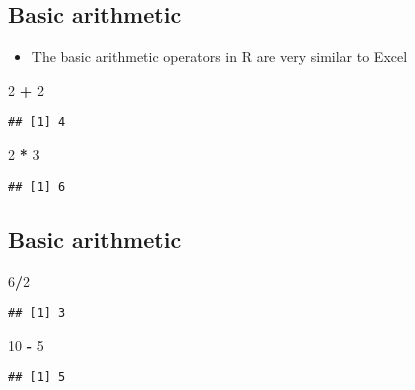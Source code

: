 \documentclass[]{article}
\newenvironment{Shaded}{\begin{snugshade}}{\end{snugshade}}
\newcommand{\DecValTok}[1]{\textcolor[rgb]{0.00,0.00,0.81}{#1}}
\newcommand{\StringTok}[1]{\textcolor[rgb]{0.31,0.60,0.02}{#1}}
\newcommand{\OperatorTok}[1]{\textcolor[rgb]{0.81,0.36,0.00}{\textbf{#1}}}
\providecommand{\tightlist}{%
  \setlength{\itemsep}{0pt}\setlength{\parskip}{0pt}}
\begin{document}
\subsection{Basic arithmetic}\label{basic-arithmetic}

\begin{itemize}
\tightlist
\item
  The basic arithmetic operators in R are very similar to Excel
\end{itemize}

\begin{Shaded}
\begin{Highlighting}[]
\DecValTok{2} \OperatorTok{+}\StringTok{ }\DecValTok{2}
\end{Highlighting}
\end{Shaded}

\begin{verbatim}
## [1] 4
\end{verbatim}

\begin{Shaded}
\begin{Highlighting}[]
\DecValTok{2} \OperatorTok{*}\StringTok{ }\DecValTok{3}
\end{Highlighting}
\end{Shaded}

\begin{verbatim}
## [1] 6
\end{verbatim}

\subsection{Basic arithmetic}\label{basic-arithmetic-1}

\begin{Shaded}
\begin{Highlighting}[]
\DecValTok{6}\OperatorTok{/}\DecValTok{2}
\end{Highlighting}
\end{Shaded}

\begin{verbatim}
## [1] 3
\end{verbatim}

\begin{Shaded}
\begin{Highlighting}[]
\DecValTok{10} \OperatorTok{-}\StringTok{ }\DecValTok{5}
\end{Highlighting}
\end{Shaded}

\begin{verbatim}
## [1] 5
\end{verbatim}
\end{document}
